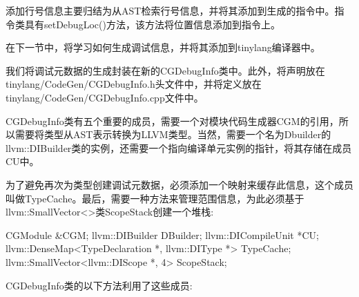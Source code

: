 添加行号信息主要归结为从AST检索行号信息，并将其添加到生成的指令中。指令类具有setDebugLoc()方法，该方法将位置信息添加到指令上。

在下一节中，将学习如何生成调试信息，并将其添加到tinylang编译器中。


我们将调试元数据的生成封装在新的CGDebugInfo类中。此外，将声明放在tinylang/CodeGen/CGDebugInfo.h头文件中，并将定义放在tinylang/CodeGen/CGDebugInfo.cpp文件中。

CGDebugInfo类有五个重要的成员，需要一个对模块代码生成器CGM的引用，所以需要将类型从AST表示转换为LLVM类型。当然，需要一个名为Dbuilder的llvm::DIBuilder类的实例，还需要一个指向编译单元实例的指针，将其存储在成员CU中。

为了避免再次为类型创建调试元数据，必须添加一个映射来缓存此信息，这个成员叫做TypeCache。最后，需要一种方法来管理范围信息，为此必须基于llvm::SmallVector<>类ScopeStack创建一个堆栈:

\begin{cpp}
CGModule &CGM;
llvm::DIBuilder DBuilder;
llvm::DICompileUnit *CU;
llvm::DenseMap<TypeDeclaration *, llvm::DIType *>
    TypeCache;
llvm::SmallVector<llvm::DIScope *, 4> ScopeStack;
\end{cpp}

CGDebugInfo类的以下方法利用了这些成员:

